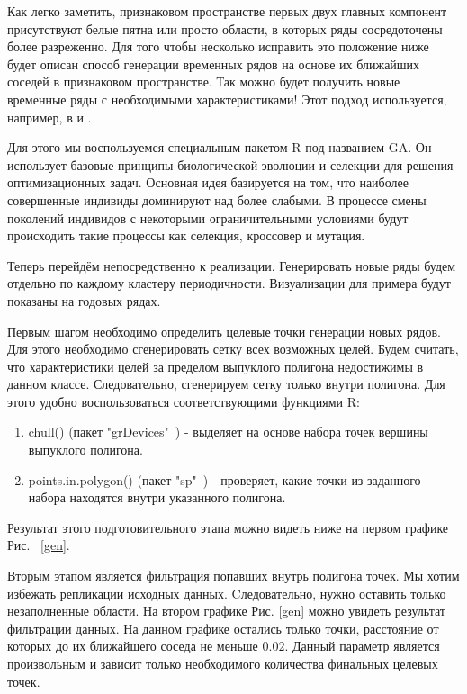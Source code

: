 \documentclass[a4paper,12pt]{article}
\begin{document}
Как легко заметить, признаковом пространстве первых двух главных компонент присутствуют белые пятна или просто области, в которых ряды сосредоточены более разреженно. Для того чтобы несколько исправить это положение ниже будет описан способ генерации временных рядов на основе их ближайших соседей в признаковом пространстве. Так можно будет получить новые временные ряды с необходимыми характеристиками! Этот подход используется, например, в \cite[стр.18]{start} и \cite[стр.10]{visual}.

Для этого мы воспользуемся специальным пакетом R под названием GA. Он использует базовые принципы биологической эволюции и селекции для решения оптимизационных задач. Основная идея базируется на том, что наиболее совершенные индивиды доминируют над более слабыми. В процессе смены поколений индивидов с некоторыми ограничительными условиями будут происходить такие процессы как селекция, кроссовер и мутация. 

Теперь перейдём непосредственно к реализации. Генерировать новые ряды будем отдельно по каждому кластеру периодичности. Визуализации для примера будут показаны на годовых рядах.

Первым шагом необходимо определить целевые точки генерации новых рядов. Для этого необходимо сгенерировать сетку всех возможных целей. Будем считать, что характеристики целей за пределом выпуклого полигона недостижимы в данном классе. Следовательно, сгенерируем сетку только внутри полигона. Для этого удобно воспользоваться соответствующими функциями R:
\begin{enumerate}
	\item chull() (пакет "grDevices"\ ) - выделяет на основе набора точек вершины выпуклого полигона.
	\item points.in.polygon() (пакет "sp"\ ) - проверяет, какие точки из заданного набора находятся внутри указанного полигона.
\end{enumerate}	

Результат этого подготовительного этапа можно видеть ниже на первом графике Рис.~ \ref{gen}.

Вторым этапом является фильтрация попавших внутрь полигона точек. Мы хотим избежать репликации исходных данных. Cледовательно, нужно оставить только незаполненные области. На втором графике Рис. \ref{gen} можно увидеть результат фильтрации данных. На данном графике остались только точки, расстояние от которых до их ближайшего соседа не меньше $ 0.02 $. Данный параметр является произвольным и зависит только необходимого количества финальных целевых точек.
\end{document}
